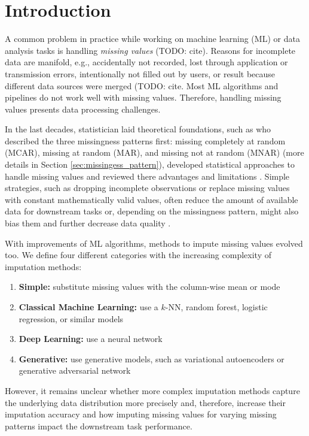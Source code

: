 \section{Introduction}
\label{sec:introduction}

A common problem in practice while working on machine learning (ML) or data analysis tasks is handling \emph{missing values} (TODO: cite). Reasons for incomplete data are manifold, e.g., accidentally not recorded, lost through application or transmission errors, intentionally not filled out by users, or result because different data sources were merged (TODO: cite. Most ML algorithms and pipelines do not work well with missing values. Therefore, handling missing values presents data processing challenges.

In the last decades, statistician laid theoretical foundations, such as \cite{Rubin} who described the three missingness patterns first: missing completely at random (MCAR), missing at random (MAR), and missing not at random (MNAR) (more details in Section \ref{sec:missingess_pattern}), developed statistical approaches to handle missing values and reviewed there advantages and limitations \citep{Graham}. Simple strategies, such as dropping incomplete observations or replace missing values with constant mathematically valid values, often reduce the amount of available data for downstream tasks or, depending on the missingness pattern, might also bias them and further decrease data quality \citep{Little, Graham}.

With improvements of ML algorithms, methods to impute missing values evolved too. We define four different categories with the increasing complexity of imputation methods:
%
\begin{enumerate}
	\item \textbf{Simple:} substitute missing values with the column-wise mean or mode
	\item \textbf{Classical Machine Learning:} use a $k$-NN, random forest, logistic regression, or similar models
	\item \textbf{Deep Learning:} use a neural network
	\item \textbf{Generative:} use generative models, such as variational autoencoders or generative adversarial network
\end{enumerate}
%
However, it remains unclear whether more complex imputation methods capture the underlying data distribution more precisely and, therefore, increase their imputation accuracy and how imputing missing values for varying missing patterns impact the downstream task performance.

